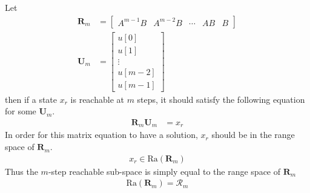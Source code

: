 \documentclass[twoside]{article}
\begin{document}
Let 
\begin{align*}
 \mathbf{R}_m &= 
        \left[ \begin{array}{c|c|c|c|c} A^{m-1} B & A^{m-2} B &
         \cdots & A B & B \end{array} \right]
\\
 \mathbf{U}_m &=
         \left[ \begin{array}{c}
                  u[0] \\ u[1] \\ \vdots \\ u[m-2] \\ u[m-1]
         \end{array} \right]
\end{align*}
%
then if a state $x_r$ is reachable at $m$ steps, it should 
satisfy the following equation for some $\mathbf{U}_m$.
%
\begin{align*}
 \mathbf{R}_m \mathbf{U}_m &= x_r
\end{align*}
%
In order for this matrix equation to have a solution, $x_r$
should be in the range space of $\mathbf{R}_m$.
%
\begin{align*}
  x_r \in \mathrm{Ra} ( \mathbf{R}_m ) 
\end{align*}
%
Thus the $m$-step reachable sub-space is simply equal to the range space of $\mathbf{R}_m$
\begin{align*}
  \mathrm{Ra} ( \mathbf{R}_m ) = \mathcal{R}_m
\end{align*}
\end{document}
